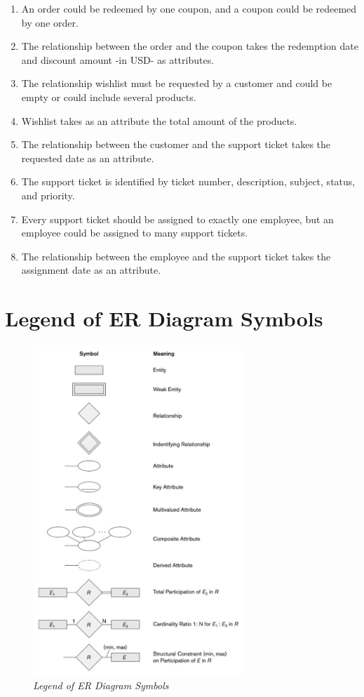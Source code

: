 \documentclass[11pt]{article}
\begin{document}
\begin{enumerate}
  \item An order could be redeemed by one coupon, and a coupon could be redeemed by one order.
  \item The relationship between the order and the coupon takes the redemption date and discount amount -in USD- as attributes.
  \item The relationship wishlist must be requested by a customer and could be empty or could include several products.
  \item Wishlist takes as an attribute the total amount of the products.
  \item The relationship between the customer and the support ticket takes the requested date as an attribute.
  \item The support ticket is identified by ticket number, description, subject, status, and priority.
  \item Every support ticket should be assigned to exactly one employee, but an employee could be assigned to many support tickets.
  \item The relationship between the employee and the support ticket takes the assignment date as an attribute.
\end{enumerate}

\section{Legend of ER Diagram Symbols}

\begin{figure}[H]
  \includegraphics[width=0.7\textwidth]{images/legend.png}
  \caption{\textit{Legend of ER Diagram Symbols}}
\end{figure}
\end{document}
